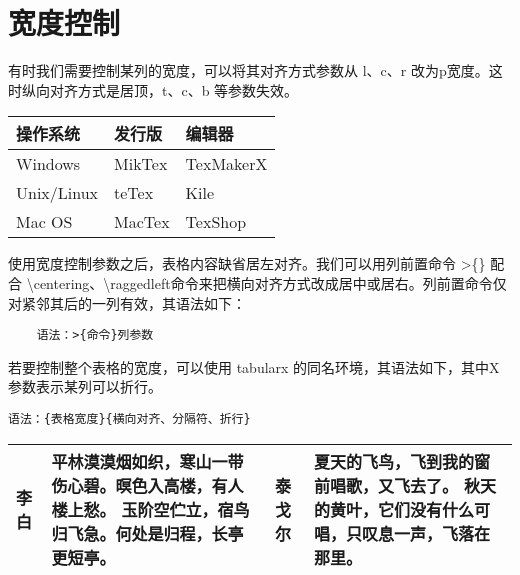 \documentclass[UTF8]{article}
\begin{document}
\section{宽度控制}
有时我们需要控制某列的宽度，可以将其对齐方式参数从 l、c、r 改为p{宽度}。这时纵向对齐方式是居顶，t、c、b 等参数失效。
\begin{table}[htbp]
\centering
\begin{tabular}{p{80pt}p{80pt}p{80pt}}
	\toprule
	操作系统 & 发行版 & 编辑器 \\	
	\midrule
	Windows & MikTex & TexMakerX \\
	Unix/Linux & teTex & Kile \\
	Mac OS & MacTex & TexShop \\
	\bottomrule
\end{tabular}
\end{table}

使用宽度控制参数之后，表格内容缺省居左对齐。我们可以用列前置命令 >\{\} 配合 \textbackslash centering、\textbackslash raggedleft命令来把横向对齐方式改成居中或居右。列前置命令仅对紧邻其后的一列有效，其语法如下：
\begin{lstlisting}
	语法：>{命令}列参数
\end{lstlisting}

若要控制整个表格的宽度，可以使用 tabularx  的同名环境，其语法如下，其中X参数表示某列可以折行。
\begin{lstlisting}
语法：{表格宽度}{横向对齐、分隔符、折行}
\end{lstlisting}
\begin{table}[htbp]
	\centering
	\begin{tabularx}{350pt}{lXlX}
	\toprule
	李白 & 平林漠漠烟如织，寒山一带伤心碧。暝色入高楼，有人楼上愁。
	玉阶空伫立，宿鸟归飞急。何处是归程，长亭更短亭。&
	泰戈尔 & 夏天的飞鸟，飞到我的窗前唱歌，又飞去了。
	秋天的黄叶，它们没有什么可唱，只叹息一声，飞落在那里。\\
	\bottomrule
	\end{tabularx}
\end{table}
\end{document}

